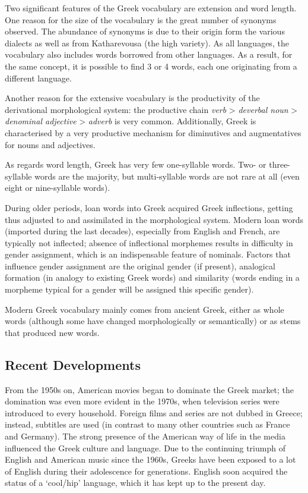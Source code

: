 \begin{multicols}{2}
Two significant features of the Greek vocabulary are extension and word length. One reason for the size of the vocabulary is the great number of synonyms observed. The abundance of synonyms is due to their origin form the various dialects as well as from Katharevousa (the high variety). As all languages, the vocabulary also includes words borrowed from other languages. As a result, for the same concept, it is possible to find 3 or 4 words, each one originating from a different language.


Another reason for the extensive vocabulary is the productivity of the derivational morphological system: the productive chain \textit{verb} >  \textit{deverbal noun} >  \textit{denominal adjective} > \textit{adverb} is very common. Additionally, Greek is characterised by a very productive mechanism for diminutives and augmentatives for nouns and adjectives.

As regards word length, Greek has very few one-syllable words. Two- or three-syllable words are the majority, but multi-syllable words are not rare at all (even eight or nine-syllable words).

During older periods, loan words into Greek acquired Greek inflections, getting thus adjusted to and assimilated in the morphological system. Modern loan words (imported during the last decades), especially from English and French, are typically not inflected; absence of inflectional morphemes results in difficulty in gender assignment, which is an indispensable feature of nominals. Factors that influence gender assignment are the original gender (if present), analogical formation (in analogy to existing Greek words) and similarity (words ending in a morpheme typical for a gender will be assigned this specific gender).

Modern Greek vocabulary mainly comes from ancient Greek, either as whole words (although some have changed morphologically or semantically) or as stems that produced new words.

\subsection{Recent Developments}

From the 1950s on, American movies began to dominate the Greek market; the domination was even more evident in the 1970s, when television series were introduced to every household. Foreign films and series are not dubbed in Greece; instead, subtitles are used (in contrast to many other countries such as France and Germany). The strong presence of the American way of life in the media influenced the Greek culture and language. Due to the continuing triumph of English and American music since the 1960s, Greeks have been exposed to a lot of English during their adolescence for generations. English soon acquired the status of a ‘cool/hip’ language, which it has kept up to the present day.


\end{multicols}
